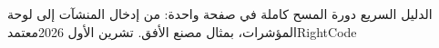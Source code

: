 \documentclass{report}
\begin{document}
{الدليل السريع}
{دورة المسح كاملة في صفحة واحدة: من إدخال المنشآت إلى لوحة المؤشرات، بمثال مصنع الأفق.}
{تشرين الأول 2026}{معتمد}{RightCode}

\end{document}
